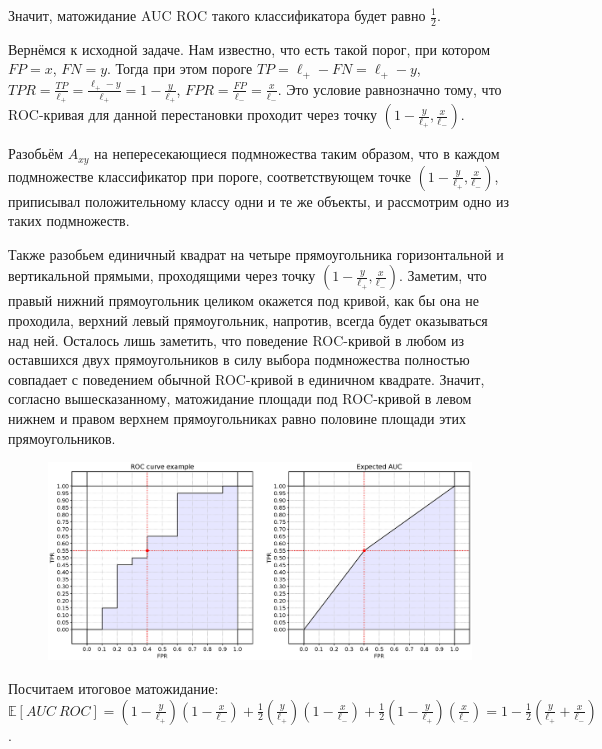 \documentclass[12pt,a4paper]{article}
\begin{document}
Значит, матожидание AUC ROC такого классификатора будет равно \(\frac{1}{2}\).

Вернёмся к исходной задаче. Нам известно, что есть такой порог, при котором \(FP = x\), \(FN = y\). Тогда при этом пороге \(TP = \ell_{+} - FN = \ell_{+} - y\), \(TPR = \frac{TP}{\ell_{+}} = \frac{\ell_{+} - y}{\ell_{+}} = 1 - \frac{y}{\ell_{+}}\), \(FPR = \frac{FP}{\ell_{-}} = \frac{x}{\ell_{-}}\). Это условие равнозначно тому, что ROC-кривая для данной перестановки проходит через точку \(\left(1 - \frac{y}{\ell_{+}}, \frac{x}{\ell_{-}}\right)\).

Разобьём \(A_{xy}\) на непересекающиеся подмножества таким образом, что в каждом подмножестве классификатор при пороге, соответствующем точке \(\left(1 - \frac{y}{\ell_{+}}, \frac{x}{\ell_{-}}\right)\), приписывал положительному классу одни и те же объекты, и рассмотрим одно из таких подмножеств.

\newpage

Также разобьем единичный квадрат на четыре прямоугольника горизонтальной и вертикальной прямыми, проходящими через точку \(\left(1 - \frac{y}{\ell_{+}}, \frac{x}{\ell_{-}}\right)\). Заметим, что правый нижний прямоугольник целиком окажется под кривой, как бы она не проходила, верхний левый прямоугольник, напротив, всегда будет оказываться над ней. Осталось лишь заметить, что поведение ROC-кривой в любом из оставшихся двух прямоугольников в силу выбора подмножества полностью совпадает с поведением обычной ROC-кривой в единичном квадрате. Значит, согласно вышесказанному, матожидание площади под ROC-кривой в левом нижнем и правом верхнем прямоугольниках равно половине площади этих прямоугольников. 

\begin{figure}[h]
\centering
\includegraphics[width=\textwidth]{./img/pic2.eps}
\end{figure}

Посчитаем итоговое матожидание: \(\mathbb{E}[AUC\ ROC] = \left(1 - \frac{y}{\ell_{+}}\right)\left(1 - \frac{x}{\ell_{-}}\right) + \frac{1}{2}\left(\frac{y}{\ell_{+}}\right)\left(1 - \frac{x}{\ell_{-}}\right) + \frac{1}{2}\left(1 - \frac{y}{\ell_{+}}\right)\left(\frac{x}{\ell_{-}}\right) = 1 - \frac{1}{2}\left(\frac{y}{\ell_{+}} + \frac{x}{\ell_{-}}\right)\).
\end{document}
